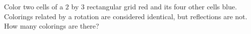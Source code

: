 Color two cells of a $2$ by $3$ rectangular grid red and its four other cells blue. Colorings related by a rotation are considered identical, but reflections are not. How many colorings are there?
